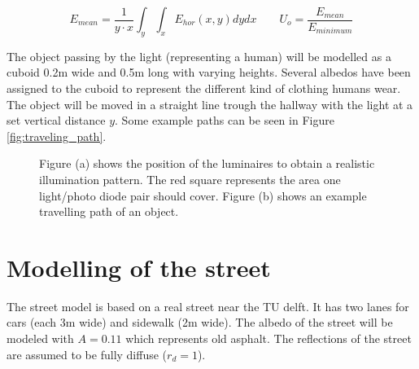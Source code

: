 \begin{equation}
\label{Emean_and_Uo}
	E_{mean} = \frac{1}{y \cdot x}\int_y \int_x E_{hor}(x,y) dy dx
\qquad
	U_o = \frac{E_{mean}}{E_{minimum}}
\end{equation}

The object passing by the light (representing a human) will be modelled as a cuboid 0.2m wide and 0.5m long with varying heights. Several albedos have been assigned to the cuboid to represent the different kind of clothing humans wear. The object will be moved in a straight line trough the hallway with the light at a set vertical distance $y$. Some example paths can be seen in Figure \ref{fig:traveling_path}.

\begin{figure}
	\centering     %
	\caption{Figure (a) shows the position of the luminaires to obtain a realistic illumination pattern. The red square represents the area one light/photo diode pair should cover. Figure (b) shows an example travelling path of an object.}
\end{figure}

\section{Modelling of the street}
The street model is based on a real street near the TU delft. It has two lanes for cars (each 3m wide) and sidewalk (2m wide). The albedo of the street will be modeled with $A = 0.11$ which represents old asphalt\cite{Albedo}. The reflections of the street are assumed to be fully diffuse ($r_d = 1$).

